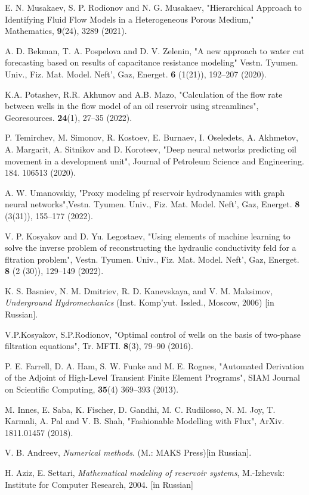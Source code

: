 \documentclass[
11pt,%
tightenlines,%
twoside,%
onecolumn,%
nofloats,%
nobibnotes,%
nofootinbib,%
superscriptaddress,%
noshowpacs,%
centertags]%
{revtex4}
\begin{document}
\begin{thebibliography}{99}
 E. N. Musakaev, S. P. Rodionov and N. G. Musakaev, "Hierarchical Approach to Identifying Fluid Flow Models in a Heterogeneous Porous Medium," Mathematics, {\bf 9}(24), 3289 (2021).

 A. D. Bekman, T. A. Pospelova and D. V. Zelenin,  "A new approach to water cut forecasting based on results of capacitance resistance modeling" Vestn. Tyumen. Univ., Fiz. Mat. Model. Neft', Gaz, Energet. {\bf 6} (1(21)), 192--207 (2020).

 K.A. Potashev, R.R. Akhunov and  A.B. Mazo, "Calculation of the flow rate between wells in the flow model of an oil reservoir using streamlines", Georesources. {\bf 24}(1), 27--35 (2022).

P. Temirchev, M. Simonov, R. Kostoev, E. Burnaev, I. Oseledets, A. Akhmetov, A. Margarit, A. Sitnikov and D. Koroteev, "Deep neural networks predicting oil movement in a development unit", Journal of Petroleum Science and Engineering. 184. 106513 (2020).

A. W. Umanovskiy, "Proxy modeling pf reservoir hydrodynamics with graph neural networks",Vestn. Tyumen. Univ., Fiz. Mat. Model. Neft', Gaz, Energet. {\bf 8} (3(31)), 155--177 (2022).

V. P. Kosyakov and D. Yu. Legostaev, "Using elements of machine learning to solve the inverse problem of reconstructing the hydraulic conductivity feld for a fltration problem", Vestn. Tyumen. Univ., Fiz. Mat. Model. Neft', Gaz, Energet. {\bf 8} (2 (30)), 129--149 (2022).

K. S. Basniev, N. M. Dmitriev, R. D. Kanevskaya, and V. M. Maksimov,  \textit{Underground Hydromechanics} (Inst.
Komp'yut. Issled., Moscow, 2006) [in Russian].


V.P.Kosyakov, S.P.Rodionov, "Optimal control of wells on the basis of two-phase filtration equations",  Tr. MFTI. {\bf 8}(3), 79--90 (2016).

P. E. Farrell, D. A. Ham, S. W. Funke and M. E. Rognes, "Automated Derivation of the Adjoint of High-Level Transient Finite Element Programs", SIAM Journal on Scientific Computing, {\bf 35}(4) 369--393 (2013).

M. Innes, E. Saba, K. Fischer, D. Gandhi, M. C. Rudilosso, N. M. Joy, T. Karmali, A. Pal and V. B. Shah, "Fashionable Modelling with Flux", ArXiv. 1811.01457 (2018).

 V. B. Andreev, \textit{Numerical methods}. (M.: MAKS Press)[in Russian].

 H. Aziz, E. Settari, \textit{Mathematical modeling of reservoir systems},  M.-Izhevsk: Institute for Computer Research, 2004. [in Russian]

\end{thebibliography}
\end{document}
